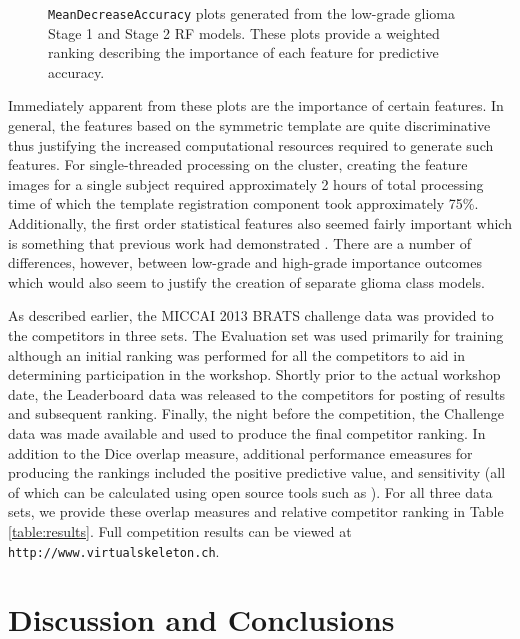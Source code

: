\begin{figure}
  \caption{{\tt MeanDecreaseAccuracy} plots generated from the low-grade glioma
  Stage 1 and Stage 2 RF models.  These plots provide a weighted 
  ranking describing the importance of each feature for predictive accuracy.
  }
  \label{fig:lgimportance}
\end{figure}

Immediately apparent from these plots are the importance of certain features.
In general, the features based on the symmetric template are quite
discriminative thus justifying the increased computational 
resources required to generate such features.  For single-threaded processing
on the cluster, creating the feature images for a single subject required 
approximately 2 hours of total processing time of which the template registration 
component took approximately 75\%.  Additionally, the first order 
statistical features also seemed fairly important which is something that
previous work had demonstrated \citep[e.g.,][]{bauer2012,zikic2012}.
There are a number of differences, however, between low-grade and high-grade 
importance outcomes which would also seem to justify the creation of separate
glioma class models.

As described earlier, the MICCAI 2013 BRATS challenge data was provided to the
competitors in three sets.  The Evaluation set was used primarily for training
although an initial ranking was performed for all the competitors to aid in
determining participation in the workshop.  Shortly prior to the actual workshop
date, the Leaderboard data was released to the competitors for posting of results
and subsequent ranking.  Finally, the night before the competition, the Challenge
data was made available and used to produce the final competitor ranking.  In addition
to the Dice overlap measure, additional performance emeasures for producing the rankings 
included the positive predictive value, and sensitivity (all of which can be calculated
using open source tools such as \cite{tustison2009}).  
For all three data sets, we provide these overlap measures and relative competitor 
ranking in Table \ref{table:results}.  Full competition results can be viewed
at {\tt http://www.virtualskeleton.ch}.

\section{Discussion and Conclusions} 

